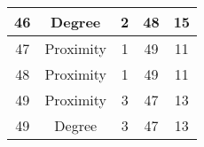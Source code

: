 \documentclass[results.tex]{subfiles}
\begin{document}
\begin{center}
\begin{tabular}{| c || c | c | c | c |}
            \hline
            46                      & Degree                       & 2                      & 48                      & 15                   \\
            \hline
            47                      & Proximity                    & 1                      & 49                      & 11                   \\
            \hline
            48                      & Proximity                    & 1                      & 49                      & 11                   \\
            \hline
            49                      & Proximity                    & 3                      & 47                      & 13                   \\
            \hline
            49                      & Degree                       & 3                      & 47                      & 13                   \\
            \hline
        \end{tabular}
    \end{center}
\end{document}
